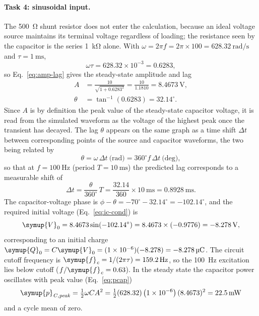 \documentclass[12pt,a4paper]{article}
\begin{document}
	\paragraph{Task 4: sinusoidal input.}
	The \SI{500}{\ohm} shunt resistor does not enter the calculation,
	because an ideal voltage source maintains its terminal voltage
	regardless of loading; the resistance seen by the capacitor is the
	series \SI{1}{\kilo\ohm} alone.  With $\omega = 2\pi f = 2\pi \times
	100 = \SI{628.32}{\radian\per\second}$ and
	$\tau = \SI{1}{\milli\second}$,
	\begin{equation}
		\omega\tau = 628.32 \times 10^{-3} = 0.6283,
	\end{equation}
	so Eq.~\eqref{eq:amp-lag} gives the steady-state amplitude and lag
	\begin{align}
		A &= \frac{10}{\sqrt{1 + 0.6283^2}}
		= \frac{10}{1.1810} = \SI{8.4673}{\volt},\\
		\theta &= \tan^{-1}(0.6283) = 32.14^{\circ}.
	\end{align}
	Since $A$ is by definition the peak value of the steady-state
	capacitor voltage, it is read from the simulated waveform as the
	voltage of the highest peak once the transient has decayed.  The lag
	$\theta$ appears on the same graph as a time shift $\Delta t$ between
	corresponding points of the source and capacitor waveforms, the two
	being related by
	\begin{equation}
		\theta = \omega\,\Delta t \ \text{(rad)}
		= 360^{\circ} f\,\Delta t \ \text{(deg)},
		\label{eq:phase-shift}
	\end{equation}
	so that at $f = \SI{100}{\hertz}$ (period $T = \SI{10}{\milli\second}$)
	the predicted lag corresponds to a measurable shift of
	\begin{equation}
		\Delta t = \frac{\theta}{360^{\circ}}\,T
		= \frac{32.14}{360} \times \SI{10}{\milli\second}
		= \SI{0.8928}{\milli\second}.
	\end{equation}
	The capacitor-voltage phase is $\phi - \theta = -70^\circ - 32.14^\circ
	= -102.14^\circ$, and the required initial voltage
	(Eq.~\eqref{eq:ic-cond}) is
	\begin{equation}
		\symup{V}_{0} = 8.4673\sin(-102.14^{\circ})
		= 8.4673 \times (-0.9776) = \SI{-8.278}{\volt},
	\end{equation}
	corresponding to an initial charge
	$\symup{Q}_{0} = C \symup{V}_{0} = (1\times10^{-6})(-8.278) =
	\SI{-8.278}{\micro\coulomb}$.  The circuit cutoff frequency is
	$\symup{f}_{\mathit{c}} = 1/(2\pi\tau) = \SI{159.2}{\hertz}$, so the
	\SI{100}{\hertz} excitation lies below cutoff
	($f/\symup{f}_{\mathit{c}} = 0.63$).  In the steady state the capacitor power
	oscillates with peak value (Eq.~\eqref{eq:pcap})
	\begin{equation}
		\symup{p}_{\mathit{C,peak}} = \tfrac{1}{2}\omega C A^{2}
		= \tfrac{1}{2}(628.32)\left(1\times10^{-6}\right)(8.4673)^2
		= \SI{22.5}{\milli\watt}
	\end{equation}
	and a cycle mean of zero.
	
\end{document}
